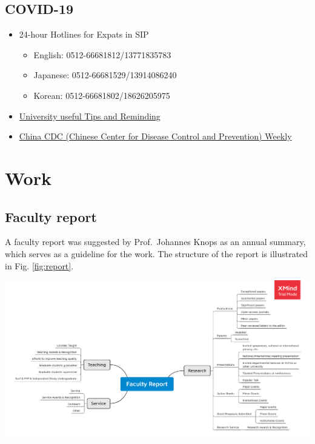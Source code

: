 \documentclass[
]{book}
\providecommand{\tightlist}{%
  \setlength{\itemsep}{0pt}\setlength{\parskip}{0pt}}
\begin{document}
\hypertarget{covid-19}{%
\section{COVID-19}\label{covid-19}}

\begin{itemize}
\tightlist
\item
  24-hour Hotlines for Expats in SIP

  \begin{itemize}
  \tightlist
  \item
    English: 0512-66681812/13771835783
  \item
    Japanese: 0512-66681529/13914086240\\
  \item
    Korean: 0512-66681802/18626205975
  \end{itemize}
\item
  \href{https://www.xjtlu.edu.cn/en/novel-coronavirus-pneumonia/useful-tips-and-reminding/}{University useful Tips and Reminding}
\item
  \href{http://weekly.chinacdc.cn/index.htm}{China CDC (Chinese Center for Disease Control and Prevention}\href{http://weekly.chinacdc.cn/index.htm}{) Weekly}
\end{itemize}

\hypertarget{work}{%
\chapter{Work}\label{work}}

\hypertarget{faculty-report}{%
\section{Faculty report}\label{faculty-report}}

A faculty report was suggested by Prof.~Johannes Knops as an annual summary, which serves as a guideline for the work. The structure of the report is illustrated in Fig. \ref{fig:report}.

\includegraphics{image/faculty_report.png}
\end{document}
